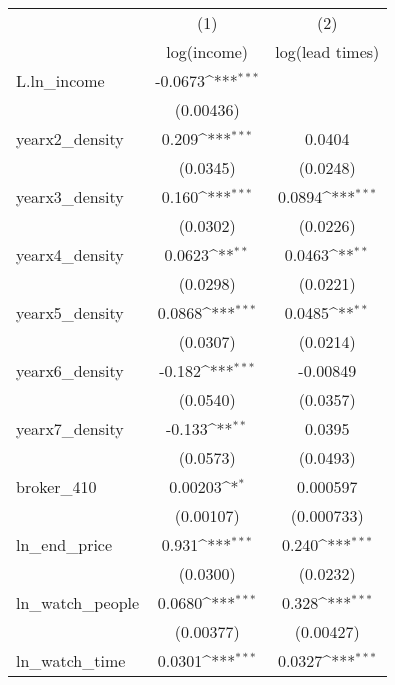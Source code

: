{
\def\sym#1{\ifmmode^{#1}\else\(^{#1}\)\fi}
\begin{tabular}{l*{2}{c}}
\toprule
            &\multicolumn{1}{c}{(1)}&\multicolumn{1}{c}{(2)}\\
            &\multicolumn{1}{c}{log(income)}&\multicolumn{1}{c}{log(lead times)}\\
\midrule
L.ln\_income &     -0.0673\sym{***}&                     \\
            &   (0.00436)         &                     \\
\addlinespace
yearx2\_density&       0.209\sym{***}&      0.0404         \\
            &    (0.0345)         &    (0.0248)         \\
\addlinespace
yearx3\_density&       0.160\sym{***}&      0.0894\sym{***}\\
            &    (0.0302)         &    (0.0226)         \\
\addlinespace
yearx4\_density&      0.0623\sym{**} &      0.0463\sym{**} \\
            &    (0.0298)         &    (0.0221)         \\
\addlinespace
yearx5\_density&      0.0868\sym{***}&      0.0485\sym{**} \\
            &    (0.0307)         &    (0.0214)         \\
\addlinespace
yearx6\_density&      -0.182\sym{***}&    -0.00849         \\
            &    (0.0540)         &    (0.0357)         \\
\addlinespace
yearx7\_density&      -0.133\sym{**} &      0.0395         \\
            &    (0.0573)         &    (0.0493)         \\
\addlinespace
broker\_410  &     0.00203\sym{*}  &    0.000597         \\
            &   (0.00107)         &  (0.000733)         \\
\addlinespace
ln\_end\_price&       0.931\sym{***}&       0.240\sym{***}\\
            &    (0.0300)         &    (0.0232)         \\
\addlinespace
ln\_watch\_people&      0.0680\sym{***}&       0.328\sym{***}\\
            &   (0.00377)         &   (0.00427)         \\
\addlinespace
ln\_watch\_time&      0.0301\sym{***}&      0.0327\sym{***}\\

\end{tabular}}
